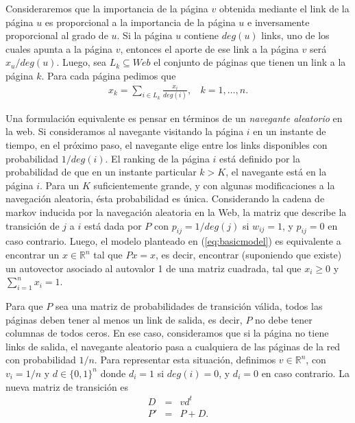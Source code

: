 \par Consideraremos que la importancia de la p\'agina $v$ obtenida mediante el link de la p\'agina $u$ es proporcional a la 
importancia de la p\'agina $u$ e inversamente proporcional al grado de $u$. Si la p\'agina $u$ contiene $deg(u)$ links,
uno de los cuales apunta a la p\'agina $v$, entonces el aporte de ese link a la p\'agina $v$ ser\'a $x_u/deg(u)$. Luego,
sea $L_k \subseteq Web$ el conjunto de p\'aginas que tienen un link a la p\'agina $k$. Para cada p\'agina pedimos que
\begin{eqnarray}
x_k = \sum_{i \in L_k} \frac{x_i}{deg(i)},~~~~k = 1,\dots,n. \label{eq:basicmodel}
\end{eqnarray}

\par Una formulación equivalente es pensar en términos de un \textit{navegante aleatorio} en la web. Si consideramos al navegante visitando la página $i$ en un instante de tiempo, en el próximo paso, el navegante elige entre los links disponibles con probabilidad $1 / deg(i)$.
El ranking de la página $i$ está definido por la probabilidad de que en un instante particular $k > K$, el navegante está en la página $i$. Para un $K$ suficientemente grande, y con algunas modificaciones a la navegación aleatoria, ésta probabilidad es única. Considerando la cadena de markov inducida por la navegación aleatoria en la Web, la matriz que describe la transición de $j$ a $i$ está dada por $P$ con $p_{ij} = 1/deg(j)$ si $w_{ij} = 1$, y $p_{ij} = 0$ en caso contrario. Luego,
el modelo planteado en (\ref{eq:basicmodel}) es equivalente a encontrar un $x\in \mathbb{R}^n$ tal que $Px = x$, es
decir, encontrar (suponiendo que existe) un autovector asociado al autovalor 1 de una matriz cuadrada, tal que $x_i \ge
0$ y $\sum_{i = 1}^n x_i = 1$.
 
\par Para que $P$ sea una matriz de probabilidades de transición válida, todos las páginas deben tener al menos un link de salida, es decir, $P$ no debe tener columnas de todos ceros. En ese caso, consideramos que si la página no tiene links de salida, el navegante aleatorio pasa a cualquiera de las páginas de la red con probabilidad $1/n$. Para representar esta situaci\'on, definimos $v \in \mathbb{R}^{n}$, con $v_i = 1/n$ y $d \in \{0,1\}^{n}$ donde 
$d_i = 1$ si $deg(i) = 0$, y $d_i = 0$ en caso contrario. La nueva matriz de transici\'on es 
\begin{eqnarray*}
D & = & v d^t \\
P' & = & P + D.
\end{eqnarray*}
 
